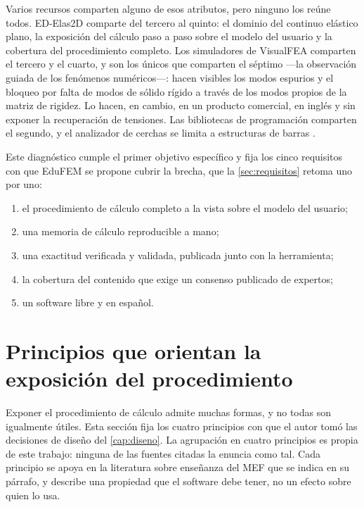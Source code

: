 Varios recursos comparten alguno de esos atributos, pero ninguno los reúne todos. ED-Elas2D comparte del tercero al quinto: el dominio del continuo elástico plano, la exposición del cálculo paso a paso sobre el modelo del usuario y la cobertura del procedimiento completo. Los simuladores de VisualFEA comparten el tercero y el cuarto, y son los únicos que comparten el séptimo ---la observación guiada de los fenómenos numéricos---: hacen visibles los modos espurios y el bloqueo por falta de modos de sólido rígido a través de los modos propios de la matriz de rigidez. Lo hacen, en cambio, en un producto comercial, en inglés y sin exponer la recuperación de tensiones. Las bibliotecas de programación comparten el segundo, y el analizador de cerchas se limita a estructuras de barras \autocite[p.~1023]{bishay2020teaching}.

Este diagnóstico cumple el primer objetivo específico y fija los cinco requisitos con que EduFEM se propone cubrir la brecha, que la \autoref{sec:requisitos} retoma uno por uno:

\begin{enumerate}
    \item el procedimiento de cálculo completo a la vista sobre el modelo del usuario;
    \item una memoria de cálculo reproducible a mano;
    \item una exactitud verificada y validada, publicada junto con la herramienta;
    \item la cobertura del contenido que exige un consenso publicado de expertos;
    \item un software libre y en español.
\end{enumerate}

\section{Principios que orientan la exposición del procedimiento}
\label{sec:fundamentos-pedagogicos}

Exponer el procedimiento de cálculo admite muchas formas, y no todas son igualmente útiles. Esta sección fija los cuatro principios con que el autor tomó las decisiones de diseño del \autoref{cap:diseno}. La agrupación en cuatro principios es propia de este trabajo: ninguna de las fuentes citadas la enuncia como tal. Cada principio se apoya en la literatura sobre enseñanza del MEF que se indica en su párrafo, y describe una propiedad que el software debe tener, no un efecto sobre quien lo usa.

